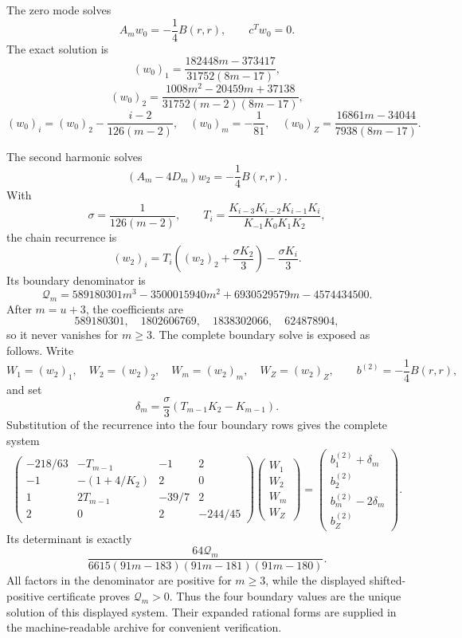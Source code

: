 \documentclass[10pt]{article}
\newcommand{\1}{\mathbf1}
\begin{document}
The zero mode solves
\[
 A_mw_0=-\frac14B(r,r),\qquad c^Tw_0=0.
\]
The exact solution is
\[
(w_0)_1=\frac{182448m-373417}{31752(8m-17)},
\]
\[
(w_0)_2=\frac{1008m^2-20459m+37138}{31752(m-2)(8m-17)},
\]
\[
(w_0)_i=(w_0)_2-\frac{i-2}{126(m-2)},\quad
(w_0)_m=-\frac1{81},\quad
(w_0)_Z=\frac{16861m-34044}{7938(8m-17)}.
\]

The second harmonic solves
\[
 (A_m-4D_m)w_2=-\frac14B(r,r).
\]
With
\[
 \sigma=\frac1{126(m-2)},\qquad
 T_i=\frac{K_{i-3}K_{i-2}K_{i-1}K_i}{K_{-1}K_0K_1K_2},
\]
the chain recurrence is
\[
 (w_2)_i=T_i\left((w_2)_2+\frac{\sigma K_2}{3}\right)
 -\frac{\sigma K_i}{3}.
\]
Its boundary denominator is
\[
 \mathcal Q_m=589180301m^3-3500015940m^2+6930529579m-4574434500.
\]
After $m=u+3$, the coefficients are
\[
589180301,\quad1802606769,\quad1838302066,\quad624878904,
\]
so it never vanishes for $m\ge3$.  The complete boundary solve is exposed
as follows.  Write
\[
 W_1=(w_2)_1,\quad W_2=(w_2)_2,\quad
 W_m=(w_2)_m,\quad W_Z=(w_2)_Z,
 \qquad b^{(2)}=-\frac14B(r,r),
\]
and set
\[
 \delta_m=\frac{\sigma}{3}
 \left(T_{m-1}K_2-K_{m-1}\right).
\]
Substitution of the recurrence into the four boundary rows gives the complete
system
\[
\begin{pmatrix}
-218/63&-T_{m-1}&-1&2\\
-1&-(1+4/K_2)&2&0\\
1&2T_{m-1}&-39/7&2\\
2&0&2&-244/45
\end{pmatrix}
\begin{pmatrix}W_1\\W_2\\W_m\\W_Z\end{pmatrix}
=
\begin{pmatrix}
b^{(2)}_1+\delta_m\\
b^{(2)}_2\\
b^{(2)}_m-2\delta_m\\
b^{(2)}_Z
\end{pmatrix}.
\]
Its determinant is exactly
\[
 \frac{64\mathcal Q_m}
 {6615(91m-183)(91m-181)(91m-180)}.
\]
All factors in the denominator are positive for $m\ge3$, while the displayed
shifted-positive certificate proves $\mathcal Q_m>0$.  Thus the four boundary
values are the unique solution of this displayed system.  Their expanded
rational forms are supplied in the machine-readable archive for convenient
verification.
\end{document}
